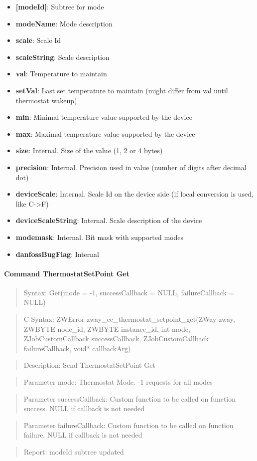 \begin{itemize}
\item \textbf{[modeId]}: Subtree for mode
\item \qquad\textbf{modeName}: Mode description
\item \qquad\textbf{scale}: Scale Id
\item \qquad\textbf{scaleString}: Scale description
\item \qquad\textbf{val}: Temperature to maintain
\item \qquad\textbf{setVal}: Last set temperature to maintain (might differ from val until thermostat wakeup)
\item \qquad\textbf{min}: Minimal temperature value supported by the device
\item \qquad\textbf{max}: Maximal temperature value supported by the device
\item \qquad\textbf{size}: Internal. Size of the value (1, 2 or 4 bytes)
\item \qquad\textbf{precision}: Internal. Precision used in value (number of digits after decimal dot)
\item \qquad\textbf{deviceScale}: Internal. Scale Id on the device side (if local conversion is used, like C->F)
\item \qquad\textbf{deviceScaleString}: Internal. Scale description of the device
\item \textbf{modemask}: Internal. Bit mask with supported modes
\item \textbf{danfossBugFlag}: Internal
\end{itemize}

\paragraph{Command ThermostatSetPoint Get}
\begin{quote}Syntax: Get(mode = -1, successCallback = NULL, failureCallback = NULL)\end{quote}
\begin{quote}C Syntax: ZWError zway\_cc\_thermostat\_setpoint\_get(ZWay zway, ZWBYTE node\_id, ZWBYTE instance\_id, int mode, ZJobCustomCallback successCallback, ZJobCustomCallback failureCallback, void* callbackArg)\end{quote}
\begin{quote}Description: Send ThermostatSetPoint Get\end{quote}
\begin{quote}Parameter mode: Thermostat Mode. -1 requests for all modes\end{quote}
\begin{quote}Parameter successCallback: Custom function to be called on function success. NULL if callback is not needed\end{quote}
\begin{quote}Parameter failureCallback: Custom function to be called on function failure. NULL if callback is not needed\end{quote}
\begin{quote}Report: modeId subtree updated\end{quote}

